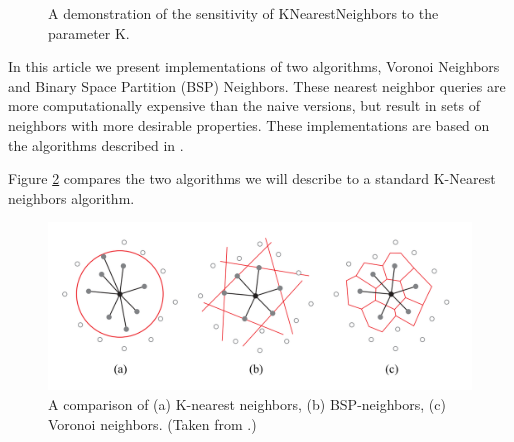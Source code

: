 \documentclass{InsightArticle}
\begin{document}
\begin{figure}[H]
\centering
{}
\caption{A demonstration of the sensitivity of KNearestNeighbors to the parameter K.}
\label{fig:KNearest}
\end{figure}

In this article we present implementations of two algorithms, Voronoi Neighbors and Binary Space Partition (BSP) Neighbors. These nearest neighbor queries are more computationally expensive than the naive versions, but result in sets of neighbors with more desirable properties. These implementations are based on the algorithms described in \cite{Pauly2003}.

Figure \ref{fig:NeighborhoodComparison} compares the two algorithms we will describe to a standard K-Nearest neighbors algorithm.

\begin{figure}[H]
  \centering
  \includegraphics[width=0.7\linewidth]{images/NeighborhoodComparison}
  \caption{A comparison of (a) K-nearest neighbors, (b) BSP-neighbors, (c) Voronoi neighbors. (Taken from \cite{Pauly2003}.)}
  \label{fig:NeighborhoodComparison}
\end{figure}
\end{document}
